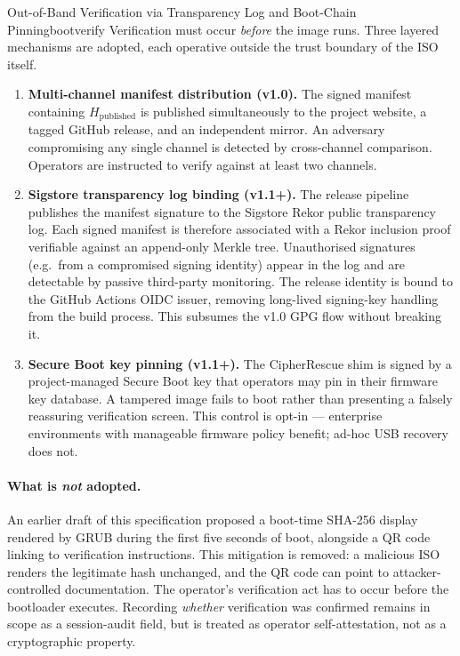 \documentclass[11pt,a4paper]{report}
\begin{document}
\begin{solution}{Out-of-Band Verification via Transparency Log and Boot-Chain Pinning}{bootverify}
\label{sec:isoverify:solution}
Verification must occur \emph{before} the image runs. Three layered mechanisms are adopted, each operative outside the trust boundary of the ISO itself.

\begin{enumerate}[noitemsep]
  \item \textbf{Multi-channel manifest distribution (v1.0).} The signed manifest containing $H_{\mathrm{published}}$ is published simultaneously to the project website, a tagged GitHub release, and an independent mirror. An adversary compromising any single channel is detected by cross-channel comparison. Operators are instructed to verify against at least two channels.
  \item \textbf{Sigstore transparency log binding (v1.1+).} The release pipeline publishes the manifest signature to the Sigstore Rekor public transparency log. Each signed manifest is therefore associated with a Rekor inclusion proof verifiable against an append-only Merkle tree. Unauthorised signatures (e.g.\ from a compromised signing identity) appear in the log and are detectable by passive third-party monitoring. The release identity is bound to the GitHub Actions OIDC issuer, removing long-lived signing-key handling from the build process. This subsumes the v1.0 GPG flow without breaking it.
  \item \textbf{Secure Boot key pinning (v1.1+).} The CipherRescue shim is signed by a project-managed Secure Boot key that operators may pin in their firmware key database. A tampered image fails to boot rather than presenting a falsely reassuring verification screen. This control is opt-in --- enterprise environments with manageable firmware policy benefit; ad-hoc USB recovery does not.
\end{enumerate}

\paragraph{What is \emph{not} adopted.} An earlier draft of this specification proposed a boot-time SHA-256 display rendered by GRUB during the first five seconds of boot, alongside a QR code linking to verification instructions. This mitigation is removed: a malicious ISO renders the legitimate hash unchanged, and the QR code can point to attacker-controlled documentation. The operator's verification act has to occur before the bootloader executes. Recording \emph{whether} verification was confirmed remains in scope as a session-audit field, but is treated as operator self-attestation, not as a cryptographic property.
\end{solution}
\end{document}
